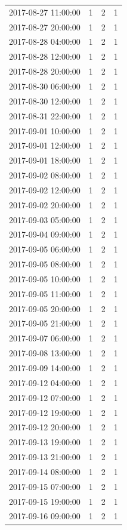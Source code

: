 \begin{tabular}{lrrr}
2017-08-27 11:00:00 & 1 & 2 & 1 \\
2017-08-27 20:00:00 & 1 & 2 & 1 \\
2017-08-28 04:00:00 & 1 & 2 & 1 \\
2017-08-28 12:00:00 & 1 & 2 & 1 \\
2017-08-28 20:00:00 & 1 & 2 & 1 \\
2017-08-30 06:00:00 & 1 & 2 & 1 \\
2017-08-30 12:00:00 & 1 & 2 & 1 \\
2017-08-31 22:00:00 & 1 & 2 & 1 \\
2017-09-01 10:00:00 & 1 & 2 & 1 \\
2017-09-01 12:00:00 & 1 & 2 & 1 \\
2017-09-01 18:00:00 & 1 & 2 & 1 \\
2017-09-02 08:00:00 & 1 & 2 & 1 \\
2017-09-02 12:00:00 & 1 & 2 & 1 \\
2017-09-02 20:00:00 & 1 & 2 & 1 \\
2017-09-03 05:00:00 & 1 & 2 & 1 \\
2017-09-04 09:00:00 & 1 & 2 & 1 \\
2017-09-05 06:00:00 & 1 & 2 & 1 \\
2017-09-05 08:00:00 & 1 & 2 & 1 \\
2017-09-05 10:00:00 & 1 & 2 & 1 \\
2017-09-05 11:00:00 & 1 & 2 & 1 \\
2017-09-05 20:00:00 & 1 & 2 & 1 \\
2017-09-05 21:00:00 & 1 & 2 & 1 \\
2017-09-07 06:00:00 & 1 & 2 & 1 \\
2017-09-08 13:00:00 & 1 & 2 & 1 \\
2017-09-09 14:00:00 & 1 & 2 & 1 \\
2017-09-12 04:00:00 & 1 & 2 & 1 \\
2017-09-12 07:00:00 & 1 & 2 & 1 \\
2017-09-12 19:00:00 & 1 & 2 & 1 \\
2017-09-12 20:00:00 & 1 & 2 & 1 \\
2017-09-13 19:00:00 & 1 & 2 & 1 \\
2017-09-13 21:00:00 & 1 & 2 & 1 \\
2017-09-14 08:00:00 & 1 & 2 & 1 \\
2017-09-15 07:00:00 & 1 & 2 & 1 \\
2017-09-15 19:00:00 & 1 & 2 & 1 \\
2017-09-16 09:00:00 & 1 & 2 & 1 \\

\end{tabular}
